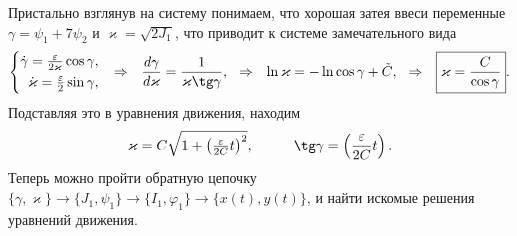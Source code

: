 Пристально взглянув на систему понимаем, что хорошая затея ввеси переменные $\gamma = \psi_1 + 7 \psi_2$ и $\varkappa = \sqrt{2 J_1}$, что приводит к системе замечательного вида
\begin{equation*}
    \left\{\begin{aligned}
        \dot{\gamma} = \textstyle \frac{\varepsilon}{2 \varkappa} \cos \gamma, \\
        \dot{\kappa} = \textstyle \frac{\varepsilon}{2} \sin \gamma,
    \end{aligned}\right.
    \hspace{0.25cm} \Rightarrow \hspace{0.25cm}
    \frac{d \gamma}{d \varkappa} = \frac{1}{\varkappa \tg \gamma},
    \hspace{0.25cm} \Rightarrow \hspace{0.25cm}
    \ln \varkappa = - \ln \cos \gamma + \tilde{C},
    \hspace{0.25cm} \Rightarrow \hspace{0.25cm}
    \boxed{\varkappa = \frac{C}{\cos \gamma}}.
\end{equation*}
Подставляя это в уравнения движения, находим
\begin{equation*}
    \varkappa = C \sqrt{1 + \textstyle \left(\frac{\varepsilon}{2C}t\right)^2},
    \hspace{10 mm} 
    \tg \gamma = \left(\frac{\varepsilon}{2C}t\right).
\end{equation*}
Теперь можно пройти обратную цепочку $\{\gamma, \varkappa\} \to \{J_1, \psi_1\} \to \{I_1, \varphi_1\} \to \{x(t), y(t)\}$, и найти искомые решения уравнений движения.